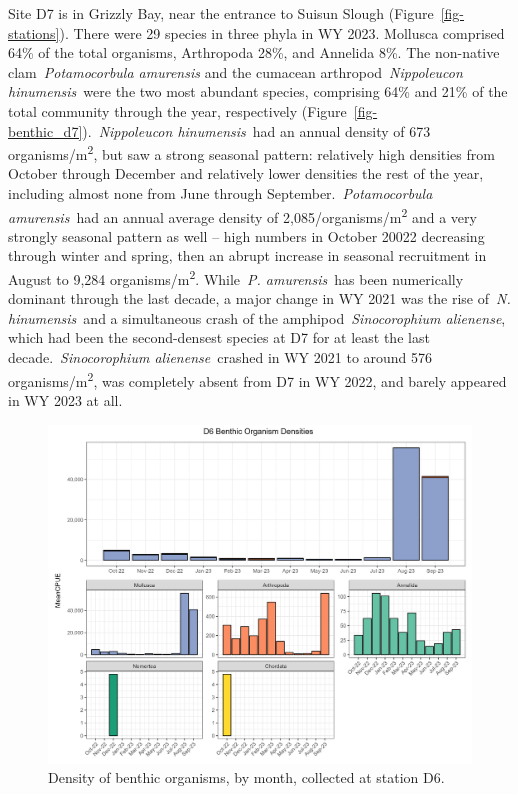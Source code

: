 \documentclass[
]{article}
\begin{document}
Site D7 is in Grizzly Bay, near the entrance to Suisun Slough
(Figure~\ref{fig-stations}). There were 29 species in three phyla in WY
2023. Mollusca comprised 64\% of the total organisms, Arthropoda 28\%,
and Annelida 8\%. The non-native clam~\emph{Potamocorbula amurensis} and
the cumacean arthropod~\emph{Nippoleucon hinumensis}~were the two most
abundant species, comprising 64\% and 21\% of the total community
through the year, respectively
(Figure~\ref{fig-benthic_d7}).~\emph{Nippoleucon hinumensis}~had an
annual density of 673 organisms/m\textsuperscript{2}, but saw a strong
seasonal pattern: relatively high densities from October through
December and relatively lower densities the rest of the year, including
almost none from June through September.~\emph{Potamocorbula
amurensis}~had an annual average density of
2,085/organisms/m\textsuperscript{2} and a very strongly seasonal
pattern as well -- high numbers in October 20022 decreasing through
winter and spring, then an abrupt increase in seasonal recruitment in
August to 9,284 organisms/m\textsuperscript{2}. While~\emph{P.
amurensis}~has been numerically dominant through the last decade, a
major change in WY 2021 was the rise of~\emph{N. hinumensis}~and a
simultaneous crash of the amphipod~\emph{Sinocorophium alienense}, which
had been the second-densest species at D7 for at least the last
decade.~\emph{Sinocorophium alienense}~crashed in WY 2021 to around 576
organisms/m\textsuperscript{2}, was completely absent from D7 in WY
2022, and barely appeared in WY 2023 at all.

\begin{figure}

{\centering \includegraphics[width=9.84in,height=\textheight]{../figures/benthic_bar_d6.jpg}

}

\caption{\label{fig-benthic_d6}Density of benthic organisms, by month,
collected at station D6.}

\end{figure}
\end{document}
